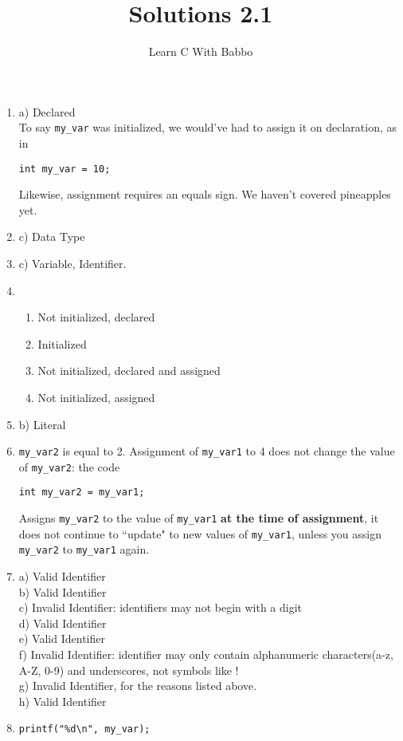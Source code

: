 \documentclass{article}
\begin{document}
\title{Solutions 2.1}
\author{Learn C With Babbo}
\date{}
\maketitle

\begin{enumerate}
\item a) Declared \\
To say \verb|my_var| was initialized, we would've had to assign it on declaration, as in 

\begin{lstlisting}[style=CStyle]
int my_var = 10;
\end{lstlisting}
Likewise, assignment requires an equals sign. We haven't covered pineapples yet.

\item c) Data Type

\item c) Variable, Identifier.

\item 
\begin{enumerate}
\item Not initialized, declared \\
\item Initialized \\
\item Not initialized, declared and assigned \\
\item Not initialized, assigned
\end{enumerate}

\item 
b) Literal

\item
\verb|my_var2| is equal to 2. Assignment of \verb|my_var1| to 4 does not change the value of \verb|my_var2|: the code

\begin{lstlisting}[style=CStyle]
int my_var2 = my_var1;
\end{lstlisting}
Assigns \verb|my_var2| to the value of \verb|my_var1| \textbf{at the time of assignment}, it does not continue to
``update" to new values of \verb|my_var1|, unless you assign \verb|my_var2| to \verb|my_var1| again.

\item
a) Valid Identifier \\
b) Valid Identifier \\
c) Invalid Identifier: identifiers may not begin with a digit \\
d) Valid Identifier \\
e) Valid Identifier \\
f) Invalid Identifier: identifier may only contain alphanumeric characters(a-z, A-Z, 0-9) and underscores, not symbols 
like ! \\
g) Invalid Identifier, for the reasons listed above. \\
h) Valid Identifier \\

\item
\begin{lstlisting}[style=CStyle]
printf("%d\n", my_var);
\end{lstlisting}
\end{enumerate}
\end{document}
